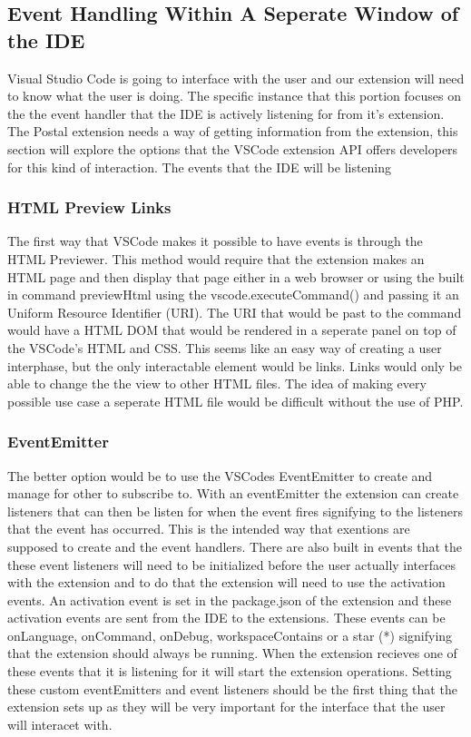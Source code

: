 \documentclass[letterpaper,10pt,titlepage,draftclsnofoot,onecolumn,onesided] {IEEEtran}
\begin{document}
%
\subsection{Event Handling Within A Seperate Window of the IDE}
Visual Studio Code is going to interface with the user and our extension will need to know what the user is doing.
The specific instance that this portion focuses on the the event handler that the IDE is actively listening for from it's extension.
The Postal extension needs a way of getting information from the extension, this section will explore the options that the VSCode extension API offers developers for this kind of interaction. 
The events that the IDE will be listening 

\subsubsection{HTML Preview Links}
The first way that VSCode makes it possible to have events is through the HTML Previewer. \cite{VSCode Documentation} 
This method would require that the extension makes an HTML page and then display that page either in a web browser or using the built in command previewHtml using the vscode.executeCommand() and passing it an Uniform Resource Identifier (URI). 
The URI that would be past to the command would have a HTML DOM that would be rendered in a seperate panel on top of the VSCode's HTML and CSS. 
This seems like an easy way of creating a user interphase, but the only interactable element would be links. 
Links would only be able to change the the view to other HTML files. 
The idea of making every possible use case a seperate HTML file would be difficult without the use of PHP.
\subsubsection{EventEmitter}
The better option would be to use the VSCodes EventEmitter to create and manage for other to subscribe to. 
With an eventEmitter the extension can create listeners that can then be listen for when the event fires signifying to the listeners that the event has occurred. 
This is the intended way that exentions are supposed to create and the event handlers. 
There are also built in events that the these event listeners will need to be initialized before the user actually interfaces with the extension and to do that the extension will need to use the activation events. 
An activation event is set in the package.json of the extension and these activation events are sent from the IDE to the extensions.
These events can be onLanguage, onCommand, onDebug, workspaceContains or a star (*) signifying that the extension should always be running. 
When the extension recieves one of these events that it is listening for it will start the extension operations. 
Setting these custom eventEmitters and event listeners should be the first thing that the extension sets up as they will be very important for the interface that the user will interacet with. \cite{VSCode Documentation}
\end{document}
